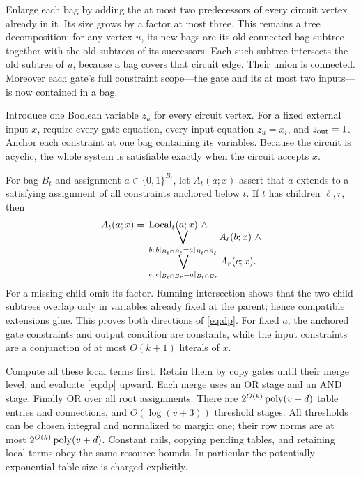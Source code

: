 \documentclass[11pt]{article}
\theoremstyle{remark}\newtheorem{remark}[theorem]{Remark}
\begin{document}
Enlarge each bag by adding the at most two predecessors of every
circuit vertex already in it. Its size grows by a factor at most
three. This remains a tree decomposition: for any vertex $u$,
its new bags are its old connected bag subtree together with the
old subtrees of its successors. Each such subtree intersects the
old subtree of $u$, because a bag covers that circuit edge.
Their union is connected. Moreover each gate's full constraint
scope---the gate and its at most two inputs---is now contained
in a bag.

Introduce one Boolean variable $z_u$ for every circuit vertex.
For a fixed external input $x$, require every gate equation,
every input equation $z_u=x_i$, and $z_{\rm out}=1$.
Anchor each constraint at one bag containing its variables.
Because the circuit is acyclic, the whole system is satisfiable
exactly when the circuit accepts $x$.

For bag $B_t$ and assignment $a\in\{0,1\}^{B_t}$, let
$A_t(a;x)$ assert that $a$ extends to a satisfying assignment
of all constraints anchored below $t$. If $t$ has children
$\ell,r$, then
\begin{align}\label{eq:dp}
 A_t(a;x)={}&\operatorname{Local}_t(a;x)\ \wedge\notag\\[-2mm]
 &\bigvee_{b:\,b|_{B_t\cap B_\ell}=a|_{B_t\cap B_\ell}}
                  A_\ell(b;x)\ \wedge\notag\\[-2mm]
 &\bigvee_{c:\,c|_{B_t\cap B_r}=a|_{B_t\cap B_r}}
                  A_r(c;x).
\end{align}
For a missing child omit its factor. Running intersection shows
that the two child subtrees overlap only in variables already
fixed at the parent; hence compatible extensions glue. This
proves both directions of \eqref{eq:dp}.
For fixed $a$, the anchored gate constraints and output
condition are constants, while the input constraints are a
conjunction of at most $O(k+1)$ literals of $x$.

Compute all these local terms first. Retain them by copy gates
until their merge level, and evaluate \eqref{eq:dp} upward.
Each merge uses an OR stage and an AND stage. Finally OR over
all root assignments. There are $2^{O(k)}\operatorname{poly}(v+d)$ table
entries and connections, and $O(\log(v+3))$ threshold stages.
All thresholds can be chosen integral and normalized to margin
one; their row norms are at most $2^{O(k)}\operatorname{poly}(v+d)$.
Constant rails, copying pending tables, and retaining local
terms obey the same resource bounds. In particular the potentially
exponential table size is charged explicitly.
\end{document}
